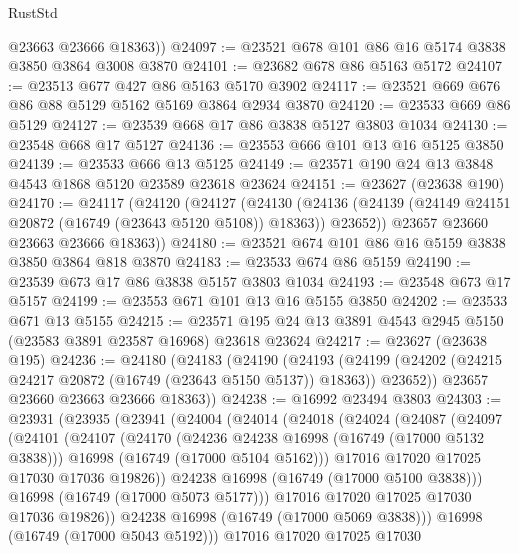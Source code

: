 \begin{lexlean}{RustStd}
\begin{coremodule}
        @23663
        @23666
        @18363))
@24097 := @23521 @678 @101 @86 @16 @5174 @3838 @3850 @3864 @3008 @3870
@24101 := @23682 @678 @86 @5163 @5172
@24107 := @23513 @677 @427 @86 @5163 @5170 @3902
@24117 := @23521 @669 @676 @86 @88 @5129 @5162 @5169 @3864 @2934 @3870
@24120 := @23533 @669 @86 @5129
@24127 := @23539 @668 @17 @86 @3838 @5127 @3803 @1034
@24130 := @23548 @668 @17 @5127
@24136 := @23553 @666 @101 @13 @16 @5125 @3850
@24139 := @23533 @666 @13 @5125
@24149 := @23571 @190 @24 @13 @3848 @4543 @1868 @5120 @23589 @23618 @23624
@24151 := @23627 (@23638 @190)
@24170 := @24117
    (@24120
      (@24127
        (@24130
          (@24136 (@24139 (@24149 @24151 @20872 (@16749 (@23643 @5120 @5108)) @18363)) @23652))
        @23657
        @23660
        @23663
        @23666
        @18363))
@24180 := @23521 @674 @101 @86 @16 @5159 @3838 @3850 @3864 @818 @3870
@24183 := @23533 @674 @86 @5159
@24190 := @23539 @673 @17 @86 @3838 @5157 @3803 @1034
@24193 := @23548 @673 @17 @5157
@24199 := @23553 @671 @101 @13 @16 @5155 @3850
@24202 := @23533 @671 @13 @5155
@24215 := @23571 @195 @24 @13 @3891 @4543 @2945 @5150 (@23583 @3891 @23587 @16968) @23618 @23624
@24217 := @23627 (@23638 @195)
@24236 := @24180
    (@24183
      (@24190
        (@24193
          (@24199 (@24202 (@24215 @24217 @20872 (@16749 (@23643 @5150 @5137)) @18363)) @23652))
        @23657
        @23660
        @23663
        @23666
        @18363))
@24238 := @16992 @23494 @3803
@24303 := @23931
    (@23935
      (@23941
        (@24004
          (@24014
            (@24018
              (@24024
                (@24087
                  (@24097
                    (@24101
                      (@24107
                        (@24170
                          (@24236 @24238 @16998 (@16749 (@17000 @5132 @3838)))
                          @16998
                          (@16749 (@17000 @5104 @5162)))
                        @17016
                        @17020
                        @17025
                        @17030
                        @17036
                        @19826))
                    @24238
                    @16998
                    (@16749 (@17000 @5100 @3838)))
                  @16998
                  (@16749 (@17000 @5073 @5177)))
                @17016
                @17020
                @17025
                @17030
                @17036
                @19826))
            @24238
            @16998
            (@16749 (@17000 @5069 @3838)))
          @16998
          (@16749 (@17000 @5043 @5192)))
        @17016
        @17020
        @17025
        @17030

\end{coremodule}
\end{lexlean}
